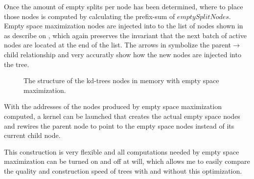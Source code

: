 Once the amount of empty splits per node has been determined, where to place
those nodes is computed by calculating the prefix-sum of
$emptySplitNodes$. Empty space maximization nodes are injected into to the list
of nodes shown in  as describe on
, which again preserves the invariant that the
next batch of active nodes are located at the end of the list. The arrows in
 symbolize the parent$\rightarrow$child
relationship and very accuratly show how the new nodes are injected into the
tree.

\begin{figure}
  \centering
  \caption{The structure of the kd-trees nodes in memory with empty
    space maximization.}
  \label{fig:emptyNodeStructure}
\end{figure}



With the addresses of the nodes produced by empty space maximization
computed, a kernel can be launched that creates the actual empty space
nodes and rewires the parent node to point to the empty space nodes
instead of its current child node. 

This construction is very flexible and all computations needed by
empty space maximization can be turned on and off at will, which
allows me to easily compare the quality and construction speed of
trees with and without this optimization.

